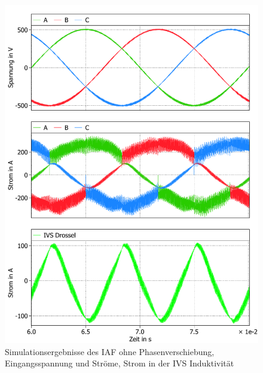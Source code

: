 		\begin{figure}
			\centering
			\includegraphics[width=1\linewidth]{content/Grafiken/IAF_AC+L}
			\caption{Simulationsergebnisse des IAF ohne Phasenverschiebung, Eingangsspannung und Ströme, Strom in der IVS Induktivität }
			\label{fig:iafacl}
		\end{figure}

